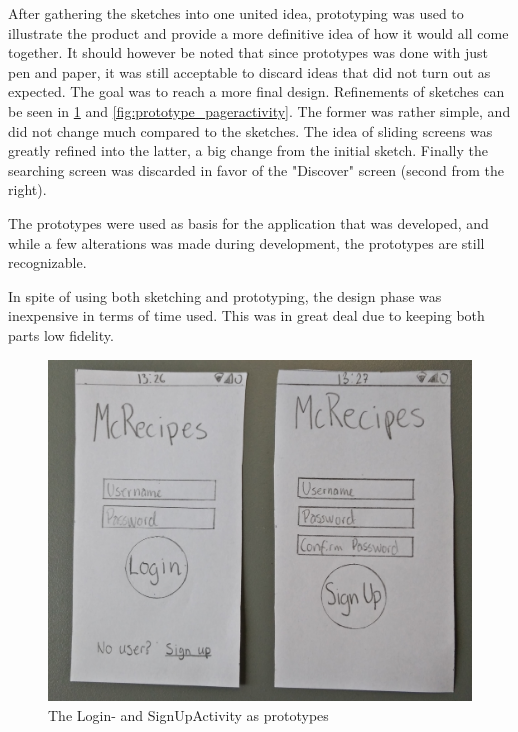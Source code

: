 After gathering the sketches into one united idea, prototyping was used to illustrate the product and provide a more definitive idea of how it would all come together. It should however be noted that since prototypes was done with just pen and paper, it was still acceptable to discard ideas that did not turn out as expected. The goal was to reach a more final design. Refinements of sketches can be seen in \ref{fig:prototype_login} and \ref{fig:prototype_pageractivity}. The former was rather simple, and did not change much compared to the sketches. The idea of sliding screens was greatly refined into the latter, a big change from the initial sketch. Finally the searching screen was discarded in favor of the "Discover" screen (second from the right).

The prototypes were used as basis for the application that was developed, and while a few alterations was made during development, the prototypes are still recognizable.

In spite of using both sketching and prototyping, the design phase was inexpensive in terms of time used. This was in great deal due to keeping both parts low fidelity.

\begin{figure}[H]
	\centering
	\includegraphics[width=\textwidth]{Pictures/prototype_login.jpg}
	\caption{The Login- and SignUpActivity as prototypes}
	\label{fig:prototype_login}
\end{figure}

